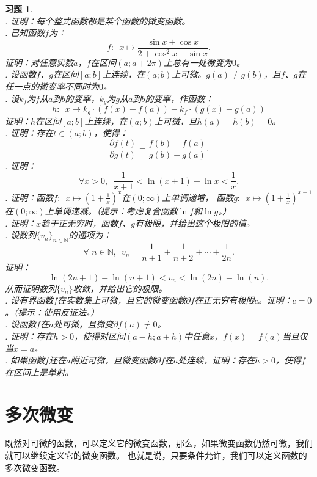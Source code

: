 \documentclass[12pt,UTF8]{ctexbook}
\theoremstyle{definition}
\theoremstyle{plain}
\newtheorem{xt}{习题}[section]
\begin{document}
\begin{xt}
    \mbox{} \\
    . 证明：每个整式函数都是某个函数的微变函数。\\
    . 已知函数$f$为：
    $$ f: \,\,\, x\mapsto \frac{\sin{x} + \cos{x}}{2 + \cos^2{x} - \sin{x}}.$$
    \indent 证明：对任意实数$a$，$f$在区间$(a; a + 2\pi)$上总有一处微变为$0$。\\
    . 设函数$f$、$g$在区间$[a; b]$上连续，在$(a; b)$上可微。$g(a) \neq g(b)$，且$f$、$g$在任一点的微变率不同时为$0$。\\
    . 设$k_f$为$f$从$a$到$b$的变率，$k_g$为$g$从$a$到$b$的变率，作函数：
    $$ h : \,\,\, x \mapsto k_g \cdot (f(x) - f(a)) - k_f \cdot (g(x) - g(a))$$
    \indent 证明：$h$在区间$[a; b]$上连续，在$(a; b)$上可微，且$h(a) = h(b) = 0$。\\
    . 证明：存在$t\in(a; b)$，使得：
    $$ \frac{\partial f (t)}{\partial g (t)} = \frac{f(b) - f(a)}{g(b) - g(a)}.$$
    . 证明：
    $$ \forall x > 0, \,\,\, \frac{1}{x+1} < \ln{(x+1)} - \ln{x} < \frac{1}{x}.$$
    . 证明：函数$f: \,\,\,x \mapsto \left(1 + \frac{1}{x}\right)^x$在$(0;\infty)$上单调递增，
    函数$g: \,\,\,x \mapsto \left(1 + \frac{1}{x}\right)^{x+1}$在$(0;\infty)$上单调递减。（提示：考虑复合函数$\ln{f}$和$\ln{g}$。）\\
    . 证明：$x$趋于正无穷时，函数$f$、$g$有极限，并给出这个极限的值。\\
    . 设数列$\{v_n\}_{n\in\mathbb{N}}$的通项为：
    $$ \forall \,\, n\in\mathbb{N},\,\,\, v_n = \frac{1}{n+1} + \frac{1}{n+2} + \cdots + \frac{1}{2n}. $$
    证明：
    $$ \ln{(2n + 1)} - \ln{(n + 1)}  < v_n < \ln{(2n)} - \ln{(n)}. $$
    从而证明数列$\{v_n\}$收敛，并给出它的极限。\\
    . 设有界函数$f$在实数集上可微，且它的微变函数$\partial f$在正无穷有极限$c$。证明：$c = 0$。（提示：使用反证法。）\\
    . 设函数$f$在$a$处可微，且微变$\partial f(a) \neq 0$。\\
    . 证明：存在$h>0$，使得对区间$(a-h;a+h)$中任意$x$，$f(x) = f(a)$当且仅当$x = a$。\\
    . 如果函数$f$还在$a$附近可微，且微变函数$\partial f$在$a$处连续，证明：存在$h>0$，使得$f$在区间上是单射。

\end{xt}

\section{多次微变}
既然对可微的函数，可以定义它的微变函数，那么，如果微变函数仍然可微，我们就可以继续定义它的微变函数。
也就是说，只要条件允许，我们可以定义函数的多次微变函数。
\end{document}

